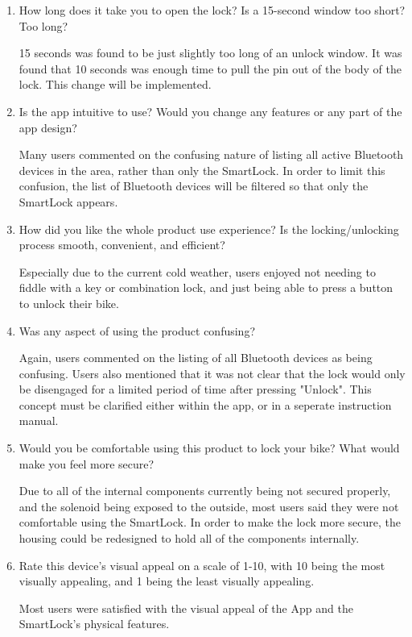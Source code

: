 \documentclass[12pt, titlepage]{article}
\begin{document}
\begin{enumerate}
    \item How long does it take you to open the lock? Is a 15-second window too short? Too long?

    15 seconds was found to be just slightly too long of an unlock window. It was found that 10 seconds was enough time to pull the pin out of the body of the lock. This change will be implemented. 
    
    \item Is the app intuitive to use? Would you change any features or any part of the app design?

    Many users commented on the confusing nature of listing all active Bluetooth devices in the area, rather than only the SmartLock. In order to limit this confusion, the list of Bluetooth devices will be filtered so that only the SmartLock appears.
    
    \item How did you like the whole product use experience? Is the locking/unlocking process smooth, convenient, and efficient?

    Especially due to the current cold weather, users enjoyed not needing to fiddle with a key or combination lock, and just being able to press a button to unlock their bike. 
    
    \item Was any aspect of using the product confusing?

    Again, users commented on the listing of all Bluetooth devices as being confusing. Users also mentioned that it was not clear that the lock would only be disengaged for a limited period of time after pressing "Unlock". This concept must be clarified either within the app, or in a seperate instruction manual.
    
    \item Would you be comfortable using this product to lock your bike? What would make you feel more secure?

    Due to all of the internal components currently being not secured properly, and the solenoid being exposed to the outside, most users said they were not comfortable using the SmartLock. In order to make the lock more secure, the housing could be redesigned to hold all of the components internally. 
    
    \item Rate this device's visual appeal on a scale of 1-10, with 10 being the most visually appealing, and 1 being the least visually appealing.
    
    Most users were satisfied with the visual appeal of the App and the SmartLock's physical features.
    
\end{enumerate}
\end{document}
